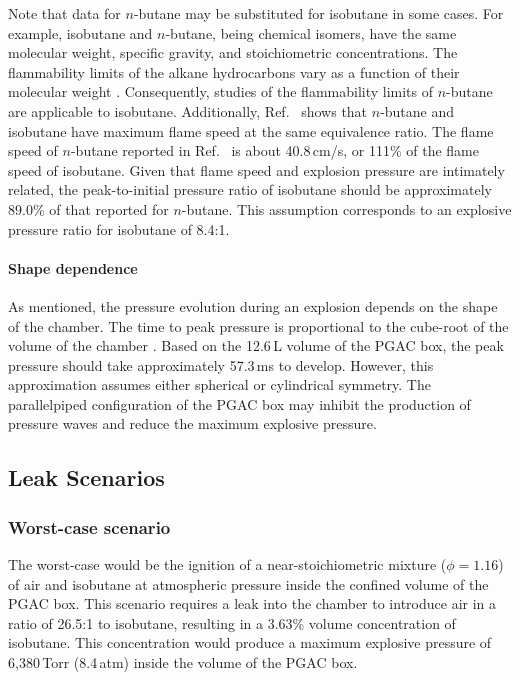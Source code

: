 Note that data for $n$-butane may be substituted  for isobutane in some cases.  For example, isobutane and $n$-butane, being chemical isomers, have the same molecular weight, specific gravity, and stoichiometric concentrations.
The flammability limits of the alkane hydrocarbons vary as a function of their molecular weight \cite{Zabetakis_1965}.  Consequently, studies of the flammability limits of $n$-butane are applicable to isobutane.  Additionally, Ref.~\cite{Davis_1998} shows that $n$-butane and isobutane have maximum flame speed at the same equivalence ratio.  The flame speed of $n$-butane reported in Ref.~\cite{Davis_1998} is about 40.8\,cm/s, or 111\% of the flame speed of isobutane.  Given that flame speed and explosion pressure are intimately related, the peak-to-initial pressure ratio of isobutane should be approximately 89.0\% of that reported for $n$-butane.  This assumption corresponds to an explosive pressure ratio for isobutane of %
8.4:1.

\paragraph{Shape dependence} As mentioned, the pressure evolution during an explosion depends on the shape of the chamber.  The time to peak pressure is proportional to the cube-root of the volume of the chamber \cite{Zabetakis_1965}. Based on the 12.6\,L volume of the PGAC box, the peak pressure should take approximately 57.3\,ms to develop.  However, this approximation assumes either spherical or cylindrical symmetry.  The parallelpiped configuration of the PGAC box may inhibit the production of pressure waves and reduce the maximum explosive pressure.


\subsection{Leak Scenarios}
\subsubsection{Worst-case scenario}
The worst-case would be the ignition of a near-stoichiometric mixture ($\phi=1.16$) of air and isobutane at atmospheric pressure  inside the confined volume  of the PGAC box. %
This scenario requires a leak into the chamber to introduce air in a ratio of 26.5:1 to isobutane, resulting in a 3.63\% volume concentration of isobutane.  This concentration would produce a maximum explosive pressure of 6,380\,Torr (8.4\,atm) %
inside the volume of the PGAC box.

